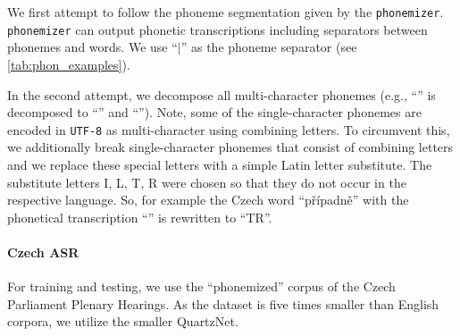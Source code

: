 We first attempt to follow the phoneme segmentation given by the \texttt{phonemizer}. \texttt{phonemizer} can output phonetic transcriptions including separators between pho\-ne\-mes and words. We use ``$\mid$'' as the phoneme separator (see \cref{tab:phon_examples}). 


In the second attempt, we decompose all multi-character phonemes (e.g., ``'' is decomposed to ``'' and ``''). Note, some of the single-character phonemes are encoded in \texttt{UTF-8} as multi-character using combining letters. To circumvent this, we additionally break single-character phonemes that consist of combining letters and we replace these special letters with a simple Latin letter substitute. The substitute letters I, L, T, R were chosen so that they do not occur in the respective language. So, for example the Czech word ``p\v{r}\'ipadn\v{e}'' with the phonetical transcription ``'' is rewritten to ``TR''.

\paragraph{Czech ASR}
For training and testing, we use the ``phonemized'' corpus of the Czech Parliament Plenary Hearings. As the dataset is five times smaller than English corpora, we utilize the smaller QuartzNet.

